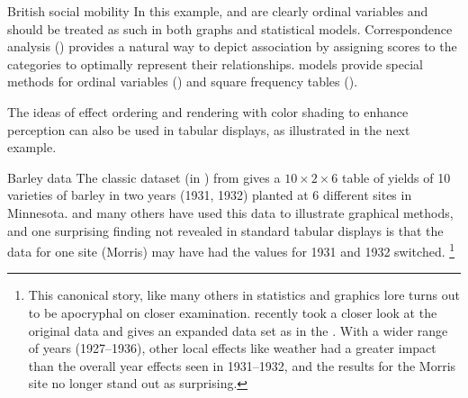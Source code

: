 \documentclass[10pt,krantz2]{krantz}\usepackage[]{graphicx}\usepackage[]{color}
\begin{document}
\begin{Example}[glass]{British social mobility}
In this example,  and  are clearly ordinal
variables and should be treated as such in both graphs and statistical models.
Correspondence analysis ()
provides a natural way to depict association by assigning scores to
the categories to optimally represent their relationships.
\Loglin models provide special methods
for ordinal variables ()
and square frequency tables ().

\end{Example}

The ideas of effect ordering and rendering with
color shading to enhance perception can
also be used in tabular displays, as illustrated in the next example.

\begin{Example}[barley]{Barley data}
The classic  dataset (in )
from \citet{Immer-etal:34}
gives a $10 \times 2 \times 6$ table of yields
of 10 varieties of barley in two years (1931, 1932)
planted at 6 different sites in Minnesota.
\citet{Cleveland:VisData} and many others have used this data to illustrate
graphical methods, and one
surprising finding not revealed in standard tabular displays
is that the data for one site (Morris) may have had
the values for 1931 and 1932 switched.%
\footnote{
This canonical story, like many others in statistics and graphics lore
turns out to be apocryphal on closer examination.
\cite{Wright:2013} recently took a closer look at the original data
and gives an expanded data set as 
in the .  With a wider range of years (1927--1936),
other local effects like weather had a greater impact than the
overall year effects seen in 1931--1932, and the results for the
Morris site no longer stand out as surprising.
}





\end{Example}
\end{document}
